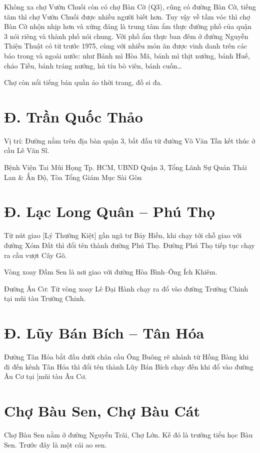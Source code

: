 Không xa chợ Vườn Chuối còn có chợ Bàn Cờ (Q3), cũng có đường Bàn Cờ, tiếng tăm thì chợ Vườn Chuối được nhiều người biết hơn. Tuy vậy về tầm vóc thì chợ Bàn Cờ nhộn nhịp hơn và xứng đáng là trung tâm ẩm thực đường phố của quận 3 nói riêng và thành phố nói chung. Với phố ẩm thực ban đêm ở đường Nguyễn Thiện Thuật có từ trước 1975, cùng với nhiều món ăn được vinh danh trên các báo trong và ngoài nước: như Bánh mì Hòa Mã, bánh mì thịt nướng, bánh Huế, cháo Tiều, bánh tráng nướng, hủ tíu bò viên, bánh cuốn…

Chợ còn nổi tiếng bán quần áo thời trang, đồ si đa.

\section{Đ. Trần Quốc Thảo}

Vị trí: Đường nằm trên địa bàn quận 3, bắt đầu từ đường Võ Văn Tần kết thúc ở cầu Lê Văn Sĩ.

Bệnh Viện Tai Mũi Họng Tp. HCM, UBND Quận 3, Tổng Lãnh Sự Quán Thái Lan \& Ấn Độ, Tòa Tổng Giám Mục Sài Gòn

\section{Đ. Lạc Long Quân -- Phú Thọ}

Từ nút giao [Lý Thường Kiệt] gần ngã tư Bảy Hiền, khi chạy tới chỗ giao với đường Xóm Đất thì đổi tên thành đường Phú Thọ. Đường Phú Thọ tiếp tục chạy ra cầu vượt Cây Gõ.

Vòng xoay Đầm Sen là nơi giao với đường Hòa Bình--Ông Ích Khiêm.

Đường Âu Cơ: Từ vòng xoay Lê Đại Hành chạy ra đổ vào đường Trường Chinh tại mũi tàu Trường Chinh.

\section{Đ. Lũy Bán Bích -- Tân Hóa}

Đường Tân Hóa bắt đầu dưới chân cầu Ông Buông rẽ nhánh từ Hồng Bàng khi đi đến kênh Tân Hóa thì đổi tên thành Lũy Bán Bích chạy đến khi đổ vào đường Âu Cơ tại [mũi tàu Âu Cơ.

\section{Chợ Bàu Sen, Chợ Bàu Cát}

Chợ Bàu Sen nằm ở đường Nguyễn Trãi, Chợ Lớn. Kế đó là trường tiểu học Bàu Sen. Trước đây là một cái ao sen.

